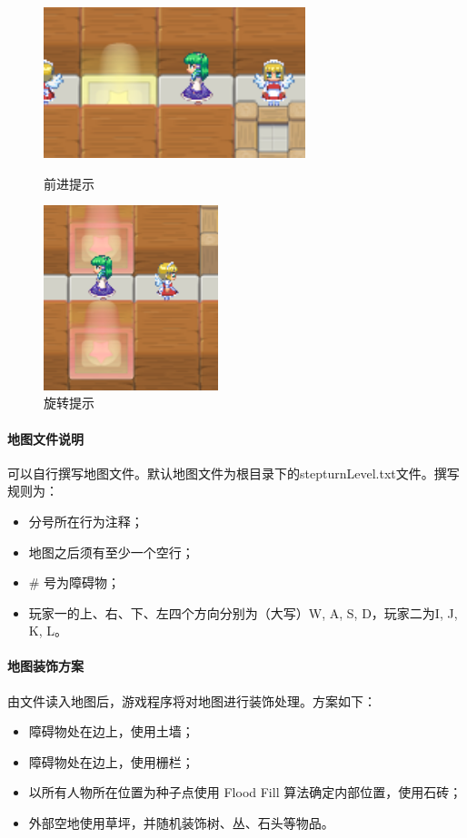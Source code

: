 \begin{figure}[htbp]
\begin{minipage}[t]{0.5\linewidth}
\centering
\includegraphics[width=3in]{pic/stephint.png}
\caption{前进提示}
\label{fig:stephint}
\end{minipage}
\begin{minipage}[t]{0.5\linewidth}
\centering
\includegraphics[width=2in]{pic/turnhint.png}
\caption{旋转提示}
\label{fig:turnhint}
\end{minipage}
\end{figure}

\paragraph{地图文件说明}
可以自行撰写地图文件。默认地图文件为根目录下的{\ttfamily stepturnLevel.txt}文件。撰写规则为：
\begin{itemize}
	\item 分号所在行为注释；
	\item 地图之后须有至少一个空行；
	\item \# 号为障碍物；
	\item 玩家一的上、右、下、左四个方向分别为（大写）{\ttfamily W, A, S, D}，玩家二为{\ttfamily I, J, K, L}。
\end{itemize}

\paragraph{地图装饰方案}
由文件读入地图后，游戏程序将对地图进行装饰处理。方案如下：
\begin{itemize}
	\item 障碍物处在边上，使用土墙；
	\item 障碍物处在边上，使用栅栏；
	\item 以所有人物所在位置为种子点使用 Flood Fill 算法确定内部位置，使用石砖；
	\item 外部空地使用草坪，并随机装饰树、丛、石头等物品。
\end{itemize}



